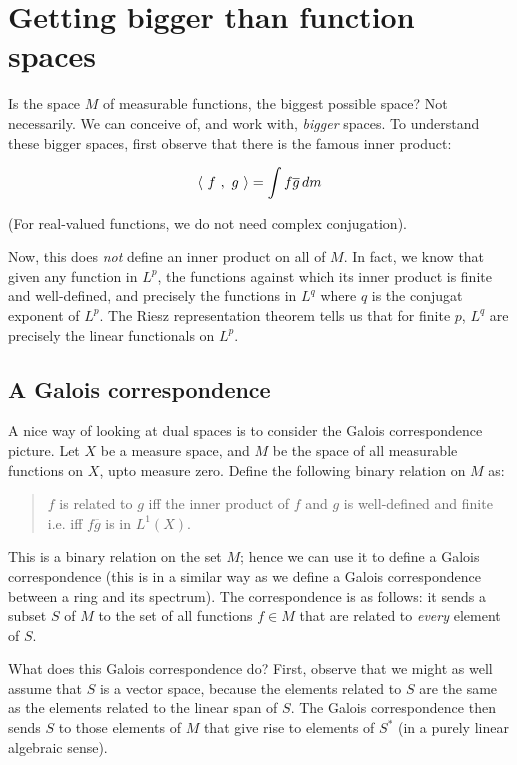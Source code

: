 \documentclass[a4paper]{amsart}
\begin{document}
\section{Getting bigger than function spaces}

Is the space $M$ of measurable functions, the biggest possible space?
Not necessarily. We can conceive of, and work with, {\em bigger}
spaces. To understand these bigger spaces, first observe that there is
the famous inner product:

$$\left< \ f \ , \ g \ \right> = \int f\overline{g} \, dm$$

(For real-valued functions, we do not need complex conjugation). 

Now, this does {\em not} define an inner product on all of $M$. In
fact, we know that given any function in $L^p$, the functions against
which its inner product is finite and well-defined, and precisely the
functions in $L^q$ where $q$ is the conjugat exponent of $L^p$. The
Riesz representation theorem tells us that for finite $p$, $L^q$ are
precisely the linear functionals on $L^p$.

\subsection{A Galois correspondence}

A nice way of looking at dual spaces is to consider the Galois
correspondence picture. Let $X$ be a measure space, and $M$ be the
space of all measurable functions on $X$, upto measure zero. Define
the following binary relation on $M$ as:

\begin{quote}
  $f$ is related to $g$ iff the inner product of $f$ and $g$ is
  well-defined and finite i.e. iff $f\overline{g}$ is in $L^1(X)$.
\end{quote}

This is a binary relation on the set $M$; hence we can use it to
define a Galois correspondence (this is in a similar way as we define
a Galois correspondence between a ring and its spectrum). The
correspondence is as follows: it sends a subset $S$ of $M$ to the set
of all functions $f \in M$ that are related to {\em every} element of
$S$.

What does this Galois correspondence do? First, observe that we might
as well assume that $S$ is a vector space, because the elements
related to $S$ are the same as the elements related to the linear span
of $S$. The Galois correspondence then sends $S$ to those elements of
$M$ that give rise to elements of $S^*$ (in a purely linear algebraic
sense).
\end{document}
